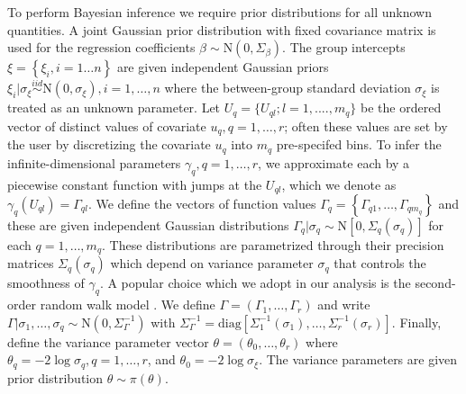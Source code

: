 \documentclass[AMA,STIX1COL,doublespace]{WileyNJD-v2}
\begin{document}
To perform Bayesian inference we require prior distributions for all unknown quantities. A joint Gaussian prior distribution with fixed covariance matrix is used for the regression coefficients $\beta \sim  \text{N}(0,\Sigma_\beta)$. The group intercepts $\xi = \left\{ \xi_{i}, i = 1\ldots n\right\}$ are given independent Gaussian priors $\xi_{i} | \sigma_{\xi} \stackrel{iid}{\sim} \text{N}(0,\sigma_{\xi}),i = 1,\ldots,n$ where the between-group standard deviation $\sigma_{\xi}$ is treated as an unknown parameter. Let $U_{q} = \{U_{ql};l = 1, ...., m_q\}$ be the ordered vector of distinct values of covariate $u_q,q = 1,\ldots,r$; often these values are set by the user by discretizing the covariate $u_q$ into $m_q$ pre-specifed bins. To infer the infinite-dimensional parameters $\gamma_{q},q = 1,\ldots,r$, we approximate each by a piecewise constant function with jumps at the $U_{ql}$, which we denote as $\gamma_{q}(U_{ql}) = \Gamma_{ql}$. We define the vectors of function values $\Gamma_{q} = \left\{ \Gamma_{q1},\ldots,\Gamma_{qm_{q}}\right\}$ and these are given independent Gaussian distributions $\Gamma_{q}|\sigma_{q}\sim\text{N}\left[ 0,\Sigma_{q}(\sigma_{q})\right]$ for each $q = 1,\ldots,m_{q}$. These distributions are parametrized through their precision matrices $\Sigma_{q}(\sigma_{q})$ which depend on variance parameter $\sigma_{q}$ that controls the smoothness of $\gamma_{q}$. A popular choice which we adopt in our analysis is the second-order random walk model \cite{rw2}. We define $\Gamma = (\Gamma_{1},\ldots,\Gamma_{r})$ and write $\Gamma|\sigma_{1},\ldots,\sigma_{q}\sim\text{N}\left( 0,\Sigma^{-1}_{\Gamma}\right)$ with $\Sigma^{-1}_{\Gamma} = \text{diag}\left[ \Sigma_{1}^{-1}(\sigma_{1}),\ldots,\Sigma_{r}^{-1}(\sigma_{r})\right]$. Finally, define the variance parameter vector $\theta = (\theta_{0},\ldots,\theta_{r})$ where $\theta_{q} = -2\log\sigma_{q},q = 1,\ldots,r$, and $\theta_{0} = -2\log\sigma_{\xi}$. The variance parameters are given prior distribution $\theta \sim \pi(\theta)$. 
\end{document}
